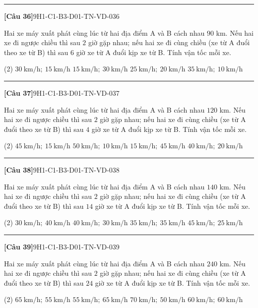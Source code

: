 \documentclass[12pt,a4paper]{article}
\newif\ifloigiai
\newenvironment{cauhoi}[2]{%
  \par\medskip\noindent\rule{\textwidth}{0.4pt}\par\nopagebreak
  \noindent\textbf{[#1]}\hfill{\scriptsize\ttfamily #2}\par\nopagebreak\smallskip}{\par}
\newcommand{\dapan}[1]{\ifloigiai\par\smallskip\noindent\textit{Đáp án:} \textbf{#1}\par\fi}
\begin{document}
\begin{cauhoi}{Câu 36}{9H1-C1-B3-D01-TN-VD-036}
Hai xe máy xuất phát cùng lúc từ hai địa điểm A và B cách nhau $90$ km. Nếu hai xe đi ngược chiều thì sau $2$ giờ gặp nhau; nếu hai xe đi cùng chiều (xe từ A đuổi theo xe từ B) thì sau $6$ giờ xe từ A đuổi kịp xe từ B. Tính vận tốc mỗi xe.
\begin{tasks}(2)
\task $30\ \text{km/h};\ 15\ \text{km/h}$
\task $15\ \text{km/h};\ 30\ \text{km/h}$
\task $25\ \text{km/h};\ 20\ \text{km/h}$
\task $35\ \text{km/h};\ 10\ \text{km/h}$
\end{tasks}
\dapan{A}
\end{cauhoi}
\begin{cauhoi}{Câu 37}{9H1-C1-B3-D01-TN-VD-037}
Hai xe máy xuất phát cùng lúc từ hai địa điểm A và B cách nhau $120$ km. Nếu hai xe đi ngược chiều thì sau $2$ giờ gặp nhau; nếu hai xe đi cùng chiều (xe từ A đuổi theo xe từ B) thì sau $4$ giờ xe từ A đuổi kịp xe từ B. Tính vận tốc mỗi xe.
\begin{tasks}(2)
\task $45\ \text{km/h};\ 15\ \text{km/h}$
\task $50\ \text{km/h};\ 10\ \text{km/h}$
\task $15\ \text{km/h};\ 45\ \text{km/h}$
\task $40\ \text{km/h};\ 20\ \text{km/h}$
\end{tasks}
\dapan{A}
\end{cauhoi}
\begin{cauhoi}{Câu 38}{9H1-C1-B3-D01-TN-VD-038}
Hai xe máy xuất phát cùng lúc từ hai địa điểm A và B cách nhau $140$ km. Nếu hai xe đi ngược chiều thì sau $2$ giờ gặp nhau; nếu hai xe đi cùng chiều (xe từ A đuổi theo xe từ B) thì sau $14$ giờ xe từ A đuổi kịp xe từ B. Tính vận tốc mỗi xe.
\begin{tasks}(2)
\task $30\ \text{km/h};\ 40\ \text{km/h}$
\task $40\ \text{km/h};\ 30\ \text{km/h}$
\task $35\ \text{km/h};\ 35\ \text{km/h}$
\task $45\ \text{km/h};\ 25\ \text{km/h}$
\end{tasks}
\dapan{B}
\end{cauhoi}
\begin{cauhoi}{Câu 39}{9H1-C1-B3-D01-TN-VD-039}
Hai xe máy xuất phát cùng lúc từ hai địa điểm A và B cách nhau $240$ km. Nếu hai xe đi ngược chiều thì sau $2$ giờ gặp nhau; nếu hai xe đi cùng chiều (xe từ A đuổi theo xe từ B) thì sau $24$ giờ xe từ A đuổi kịp xe từ B. Tính vận tốc mỗi xe.
\begin{tasks}(2)
\task $65\ \text{km/h};\ 55\ \text{km/h}$
\task $55\ \text{km/h};\ 65\ \text{km/h}$
\task $70\ \text{km/h};\ 50\ \text{km/h}$
\task $60\ \text{km/h};\ 60\ \text{km/h}$
\end{tasks}
\dapan{A}
\end{cauhoi}
\end{document}
